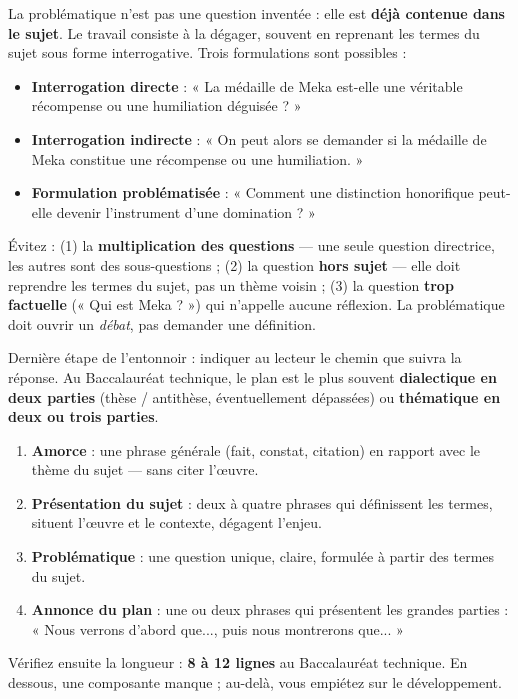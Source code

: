 \documentclass[11pt]{article}
\newcounter{popsec}
\newcounter{popsub}
\newcommand{\courssub}[1]{%
  \stepcounter{popsub}%
  \par\vspace{9pt}\noindent{\popxbold\fontsize{11.5}{13}\selectfont\color{popink}{\color{poporange}\thepopsec.\thepopsub}\hspace{6pt}#1}\par\nopagebreak\vspace{4pt}
}
\begin{document}
La problématique n'est pas une question inventée : elle est \textbf{déjà contenue dans le sujet}. Le travail consiste à la dégager, souvent en reprenant les termes du sujet sous forme interrogative. Trois formulations sont possibles :

\begin{itemize}
\item \textbf{Interrogation directe} : « La médaille de Meka est-elle une véritable récompense ou une humiliation déguisée ? »
\item \textbf{Interrogation indirecte} : « On peut alors se demander si la médaille de Meka constitue une récompense ou une humiliation. »
\item \textbf{Formulation problématisée} : « Comment une distinction honorifique peut-elle devenir l'instrument d'une domination ? »
\end{itemize}

\begin{attention}
Évitez : (1) la \textbf{multiplication des questions} — une seule question directrice, les autres sont des sous-questions ; (2) la question \textbf{hors sujet} — elle doit reprendre les termes du sujet, pas un thème voisin ; (3) la question \textbf{trop factuelle} (« Qui est Meka ? ») qui n'appelle aucune réflexion. La problématique doit ouvrir un \emph{débat}, pas demander une définition.
\end{attention}

\courssub{Composante 4 : l'annonce du plan}

Dernière étape de l'entonnoir : indiquer au lecteur le chemin que suivra la réponse. Au Baccalauréat technique, le plan est le plus souvent \textbf{dialectique en deux parties} (thèse / antithèse, éventuellement dépassées) ou \textbf{thématique en deux ou trois parties}.

\begin{methode}
\begin{enumerate}
\item \textbf{Amorce} : une phrase générale (fait, constat, citation) en rapport avec le thème du sujet — sans citer l'œuvre.
\item \textbf{Présentation du sujet} : deux à quatre phrases qui définissent les termes, situent l'œuvre et le contexte, dégagent l'enjeu.
\item \textbf{Problématique} : une question unique, claire, formulée à partir des termes du sujet.
\item \textbf{Annonce du plan} : une ou deux phrases qui présentent les grandes parties : « Nous verrons d'abord que..., puis nous montrerons que... »
\end{enumerate}
Vérifiez ensuite la longueur : \textbf{8 à 12 lignes} au Baccalauréat technique. En dessous, une composante manque ; au-delà, vous empiétez sur le développement.
\end{methode}
\end{document}

